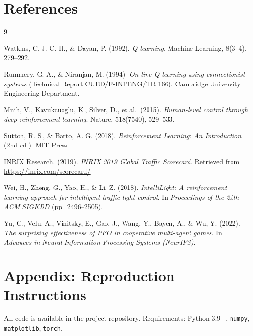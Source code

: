 \documentclass[12pt]{article}
\begin{document}
\section*{References}
\begin{thebibliography}{9}

Watkins, C. J. C. H., \& Dayan, P. (1992).
\textit{Q-learning}.
Machine Learning, 8(3--4), 279--292.

Rummery, G. A., \& Niranjan, M. (1994).
\textit{On-line Q-learning using connectionist systems}
(Technical Report CUED/F-INFENG/TR 166).
Cambridge University Engineering Department.

Mnih, V., Kavukcuoglu, K., Silver, D., et al.\ (2015).
\textit{Human-level control through deep reinforcement learning}.
Nature, 518(7540), 529--533.

Sutton, R. S., \& Barto, A. G. (2018).
\textit{Reinforcement Learning: An Introduction} (2nd ed.).
MIT Press.

INRIX Research. (2019).
\textit{INRIX 2019 Global Traffic Scorecard}.
Retrieved from \url{https://inrix.com/scorecard/}

Wei, H., Zheng, G., Yao, H., \& Li, Z. (2018).
\textit{IntelliLight: A reinforcement learning approach for intelligent traffic light
control}.
In \textit{Proceedings of the 24th ACM SIGKDD} (pp.\ 2496--2505).

Yu, C., Velu, A., Vinitsky, E., Gao, J., Wang, Y., Bayen, A., \& Wu, Y. (2022).
\textit{The surprising effectiveness of PPO in cooperative multi-agent games}.
In \textit{Advances in Neural Information Processing Systems (NeurIPS)}.

\end{thebibliography}

\appendix
\section*{Appendix: Reproduction Instructions}
All code is available in the project repository. Requirements: Python 3.9+,
\texttt{numpy}, \texttt{matplotlib}, \texttt{torch}.
\end{document}
